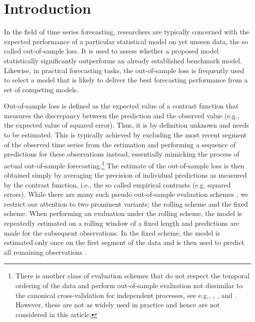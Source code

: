 \documentclass[11pt,dvipsnames]{article}
\begin{document}
\section{Introduction}

In the field of time series forecasting, researchers are typically concerned with the expected performance of a particular statistical model on yet unseen data, the so called out-of-sample loss. It is used to assess whether a proposed model statistically significantly outperforms an already established benchmark model. Likewise, in practical forecasting tasks, the out-of-sample loss is frequently used to select a model that is likely to deliver the best forecasting performance from a set of competing models. 

Out-of-sample loss is defined as the expected value of a contrast function that measures the discrepancy between the prediction and the observed value (e.g., the expected value of squared error). Thus, it is by definition unknown and needs to be estimated. This is typically achieved by excluding the most recent segment of the observed time series from the estimation and performing a sequence of predictions for these observations instead, essentially mimicking the process of actual out-of-sample forecasting.\footnote{There is another class of evaluation schemes that do not respect the temporal ordering of the data and perform out-of-sample evaluation not dissimilar to the canonical cross-validation for independent processes, see e.g., \citet{burmanCrossvalidatoryMethodDependent1994}, \citet{racineConsistentCrossvalidatoryModelselection2000}, and \citet{bergmeirNoteValidityCrossvalidation2018}. However, these are not as widely used in practice and hence are not considered in this article.} The estimate of the out-of-sample loss is then obtained simply by averaging the precision of individual predictions as measured by the contrast function, i.e., the so called empirical contrasts (e.g. squared errors). While there are many such pseudo out-of-sample evaluation schemes \citep[for a survey, see][]{tashmanOutofsampleTestsForecasting2000}, we restrict our attention to two prominent variants; the rolling scheme and the fixed scheme. When performing an evaluation under the rolling scheme, the model is repeatedly estimated on a rolling window of a fixed length and predictions are made for the subsequent observations. In the fixed scheme, the model is estimated only once on the first segment of the data and is then used to predict all remaining observations \citep[see e.g.][]{clarkChapter20Advances2013}.
\end{document}
